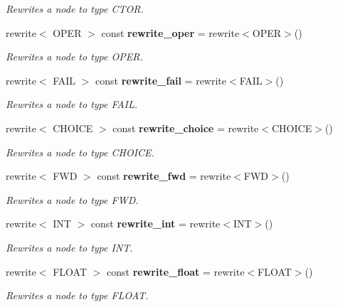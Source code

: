 \begin{CompactItemize}
\begin{CompactList}\small\item\em Rewrites a node to type CTOR. \item\end{CompactList}\item 
rewrite$<$ OPER $>$ const {\bf rewrite\_\-oper} = rewrite$<$OPER$>$()\label{namespacesprite_a37}

\begin{CompactList}\small\item\em Rewrites a node to type OPER. \item\end{CompactList}\item 
rewrite$<$ FAIL $>$ const {\bf rewrite\_\-fail} = rewrite$<$FAIL$>$()\label{namespacesprite_a38}

\begin{CompactList}\small\item\em Rewrites a node to type FAIL. \item\end{CompactList}\item 
rewrite$<$ CHOICE $>$ const {\bf rewrite\_\-choice} = rewrite$<$CHOICE$>$()\label{namespacesprite_a39}

\begin{CompactList}\small\item\em Rewrites a node to type CHOICE. \item\end{CompactList}\item 
rewrite$<$ FWD $>$ const {\bf rewrite\_\-fwd} = rewrite$<$FWD$>$()\label{namespacesprite_a40}

\begin{CompactList}\small\item\em Rewrites a node to type FWD. \item\end{CompactList}\item 
rewrite$<$ INT $>$ const {\bf rewrite\_\-int} = rewrite$<$INT$>$()\label{namespacesprite_a41}

\begin{CompactList}\small\item\em Rewrites a node to type INT. \item\end{CompactList}\item 
rewrite$<$ FLOAT $>$ const {\bf rewrite\_\-float} = rewrite$<$FLOAT$>$()\label{namespacesprite_a42}

\begin{CompactList}\small\item\em Rewrites a node to type FLOAT. \item\end{CompactList}\end{CompactItemize}


